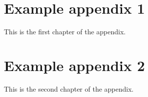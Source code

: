 \chapter{Example appendix 1}
This is the first chapter of the appendix.

\chapter{Example appendix 2}
This is the second chapter of the appendix.
